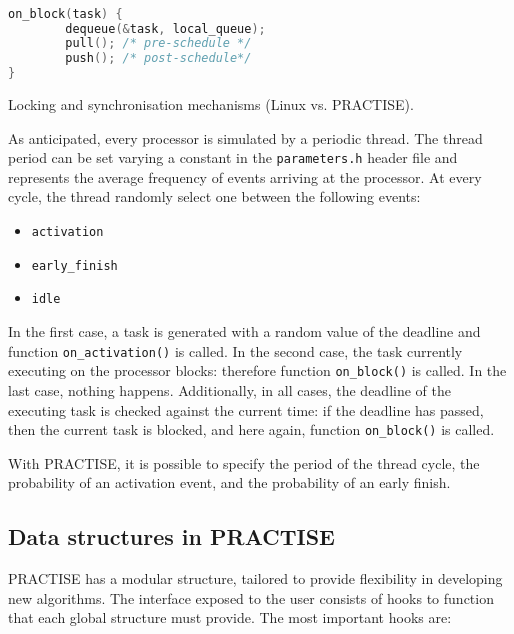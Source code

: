 \begin{lstlisting}[language=C, caption={Task blocking pseudo-code},
                        label={lst:task_blocking}]

on_block(task) {
        dequeue(&task, local_queue);
        pull(); /* pre-schedule */
        push(); /* post-schedule*/
}

\end{lstlisting}

\begin{table*}[htb]

\caption{Locking and synchronisation mechanisms (Linux vs. PRACTISE).}
\label{tab:lock_compare}
\end{table*}

As anticipated, every processor is simulated by a periodic thread. The thread period can be set varying
a constant in the \texttt{parameters.h} header file and represents the average frequency of events 
arriving at the processor. At every cycle, the thread randomly select one between the following events:

\begin{itemize}
\item \texttt{activation}
\item \texttt{early\_finish}
\item \texttt{idle}
\end{itemize}

In the first case, a task is generated with a random value of the deadline and function 
\texttt{on\_activation()} is called. In the second case, the task currently executing on the processor 
blocks: therefore function \texttt{on\_block()} is called. In the last case, nothing happens.
Additionally, in all cases, the deadline of the executing task is checked against the current time: 
if the deadline has passed, then the current task is blocked, and here again, function \texttt{on\_block()} 
is called.

With PRACTISE, it is possible to specify the period of the thread cycle, the probability of an activation
event, and the probability of an early finish.

\subsection{Data structures in PRACTISE\label{sec:PRACTISE_data_struct}}

PRACTISE has a modular structure, tailored to provide flexibility in developing new algorithms. The
interface exposed to the user consists of hooks to function that each global structure must provide.
The most important hooks are:

